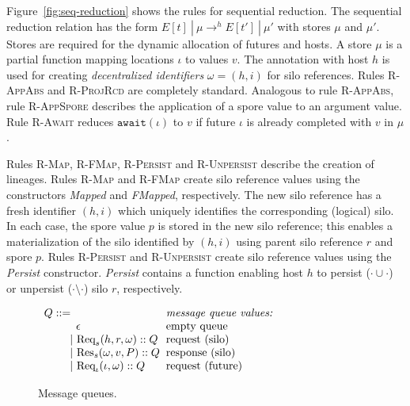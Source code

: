 Figure~\ref{fig:seq-reduction} shows the rules for sequential
reduction. The sequential reduction relation has the form $E[t]~|~\mu
\rightarrow^h E[t']~|~\mu'$ with stores $\mu$ and $\mu'$. Stores are
required for the dynamic allocation of futures and hosts.  A store
$\mu$ is a partial function mapping locations $\iota$ to values $v$.
The annotation with host $h$ is used for creating {\em decentralized
  identifiers} $\omega = (h, i)$ for silo references.  Rules
\textsc{R-AppAbs} and \textsc{R-ProjRcd} are completely standard.
Analogous to rule \textsc{R-AppAbs}, rule \textsc{R-AppSpore}
describes the application of a spore value to an argument value. Rule
\textsc{R-Await} reduces $\texttt{await}(\iota)$ to $v$ if future
$\iota$ is already completed with $v$ in $\mu$.

Rules \textsc{R-Map}, \textsc{R-FMap}, \textsc{R-Persist} and
\textsc{R-Unpersist} describe the creation of lineages.  Rules
\textsc{R-Map} and \textsc{R-FMap} create silo reference values using
the constructors {\em Mapped} and {\em FMapped}, respectively. The new
silo reference has a fresh identifier $(h, i)$ which uniquely
identifies the corresponding (logical) silo. In each case, the spore
value $p$ is stored in the new silo reference; this enables a
materialization of the silo identified by $(h, i)$ using parent silo
reference $r$ and spore $p$. Rules \textsc{R-Persist} and
\textsc{R-Unpersist} create silo reference values using the {\em
  Persist} constructor. {\em Persist} contains a function enabling
host $h$ to persist ($\cdot \cup \cdot$) or unpersist ($\cdot
\setminus \cdot$) silo $r$, respectively.

\begin{figure}
\centering
$\ba[t]{l@{\hspace{2mm}}l}
Q      ::=                             & \mbox{{\it{message queue values:}}}  \\
\gap \:\:\:\: \epsilon                 & \mbox{empty queue}       \\
\gap ~|~    {\Req h r \omega} :: Q     & \mbox{request (silo)}    \\
\gap ~|~    {\Res \omega v P} :: Q     & \mbox{response (silo)}   \\
\gap ~|~    {\ReqF \iota \omega} :: Q  & \mbox{request (future)}  \\
\ea$
\caption{Message queues.}\label{fig:queues}
\end{figure}

